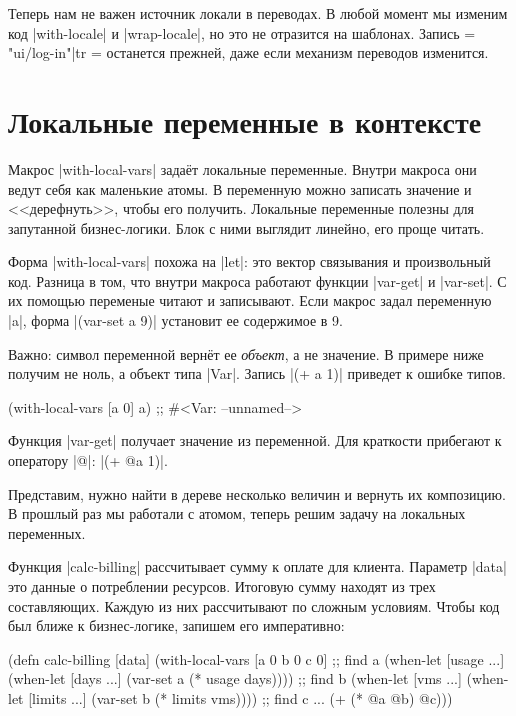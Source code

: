 Теперь нам не важен источник локали в переводах. В любой момент мы изменим код
\spverb|with-locale| и \spverb|wrap-locale|, но это не отразится на
шаблонах. Запись \spverb={{ "ui/log-in"|tr }}= останется прежней, даже если
механизм переводов изменится.

\section{Локальные переменные в контексте}

Макрос \spverb|with-local-vars| зада\"{е}т локальные переменные. Внутри макроса они
ведут себя как маленькие атомы. В переменную можно записать значение и
<<дерефнуть>>, чтобы его получить. Локальные переменные полезны для запутанной
бизнес-логики. Блок с ними выглядит линейно, его проще читать.

Форма \spverb|with-local-vars| похожа на \spverb|let|: это вектор связывания и
произвольный код. Разница в том, что внутри макроса работают функции
\spverb|var-get| и \spverb|var-set|. С их помощью переменые читают и
записывают. Если макрос задал переменную \spverb|a|, форма
\spverb|(var-set a 9)| установит ее содержимое в 9.

Важно: символ переменной верн\"{е}т ее \emph{объект}, а не значение. В примере ниже
получим не ноль, а объект типа \spverb|Var|. Запись \spverb|(+ a 1)| приведет к
ошибке типов.

\begin{english}
  \begin{clojure}
(with-local-vars [a 0] a)
;; #<Var: --unnamed-->
  \end{clojure}
\end{english}

Функция \spverb|var-get| получает значение из переменной. Для краткости
прибегают к оператору \spverb|@|: \spverb|(+ @a 1)|.

Представим, нужно найти в дереве несколько величин и вернуть их композицию. В
прошлый раз мы работали с атомом, теперь решим задачу на локальных переменных.

Функция \spverb|calc-billing| рассчитывает сумму к оплате для клиента. Параметр
\spverb|data| это данные о потреблении ресурсов. Итоговую сумму находят из трех
составляющих. Каждую из них рассчитывают по сложным условиям. Чтобы код был
ближе к бизнес-логике, запишем его императивно:

\begin{english}
  \begin{clojure}
(defn calc-billing [data]
  (with-local-vars
    [a 0 b 0 c 0]
    ;; find a
    (when-let [usage ...]
      (when-let [days ...]
        (var-set a (* usage days))))
    ;; find b
    (when-let [vms ...]
      (when-let [limits ...]
        (var-set b (* limits vms))))
    ;; find c ...
    (+ (* @a @b) @c)))
  \end{clojure}
\end{english}

